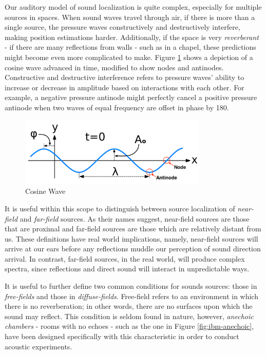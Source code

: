 Our auditory model of sound localization is quite complex, especially for multiple sources in spaces. When sound waves travel through air, if there is more than a single source, the pressure waves constructively and destructively interfere, making position estimations harder. Additionally, if the space is very \textit{reverberant} - if there are many reflections from walls - such as in a chapel, these predictions might become even more complicated to make. Figure \ref{fig:cosine-wave} shows a depiction of a cosine wave advanced in time, modified to show nodes and antinodes. Constructive and destructive interference refers to pressure waves' ability to increase or decrease in amplitude based on interactions with each other. For example, a negative pressure antinode might perfectly cancel a positive pressure antinode when two waves of equal frequency are offset in phase by 180\textdegree.

\begin{figure}[ht!]%
\centering
\includegraphics[width=0.8\textwidth]{img/cosine-wave.png} 
\caption{Cosine Wave \cite{FileWave97:online}}
\label{fig:cosine-wave}
\end{figure}

It is useful within this scope to distinguish between source localization of \textit{near-field} and \textit{far-field} sources. As their names suggest, near-field sources are those that are proximal and far-field sources are those which are relatively distant from us. These definitions have real world implications, namely, near-field sources will arrive at our ears before any reflections muddle our perception of sound direction arrival. In contrast, far-field sources, in the real world, will produce complex spectra, since reflections and direct sound will interact in unpredictable ways. 

It is useful to further define two common conditions for sounds sources: those in \textit{free-fields} and those in \textit{diffuse-fields}. Free-field refers to an environment in which there is no reverberation; in other words, there are no surfaces upon which the sound may reflect. This condition is seldom found in nature, however, \textit{anechoic chambers} - rooms with no echoes - such as the one in Figure \ref{fig:ibm-anechoic}, have been designed specifically with this characteristic in order to conduct acoustic experiments. 

